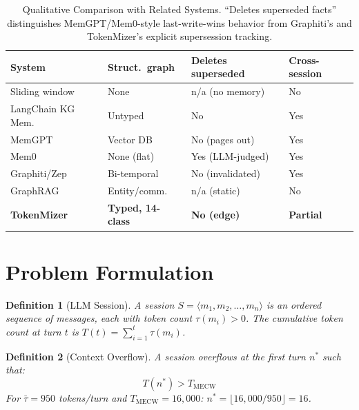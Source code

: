 \documentclass[journal]{IEEEtran}
\newtheorem{definition}{Definition}
\begin{document}
\begin{table}[t]
  \centering
  \caption{Qualitative Comparison with Related Systems.
  ``Deletes superseded facts'' distinguishes MemGPT/Mem0-style
  last-write-wins behavior from Graphiti's and TokenMizer's
  explicit supersession tracking.}
  \label{tab:related}
  \renewcommand{\arraystretch}{1.3}
  \footnotesize
  \begin{tabular}{@{}p{1.9cm}p{1.55cm}p{1.5cm}p{1.15cm}@{}}
    \toprule
    \textbf{System} & \textbf{Struct.\ graph} &
    \textbf{Deletes superseded} &
    \textbf{Cross-session} \\
    \midrule
    Sliding window      & None      & n/a (no memory) & No \\
    LangChain KG Mem.   & Untyped   & No               & Yes \\
    MemGPT~\cite{memgpt} & Vector DB & No (pages out)   & Yes \\
    Mem0~\cite{mem0}     & None (flat) & Yes (LLM-judged) & Yes \\
    Graphiti/Zep~\cite{zep} & Bi-temporal & No (invalidated) & Yes \\
    GraphRAG~\cite{graphrag} & Entity/comm. & n/a (static) & No \\
    \rowcolor{rowours}
    \textbf{TokenMizer}
      & \textbf{Typed, 14-class} & \textbf{No (edge)}
      & \textbf{Partial} \\
    \bottomrule
  \end{tabular}
\end{table}

\section{Problem Formulation}
\label{sec:problem}

\begin{definition}[LLM Session]
A session $S = \langle m_1, m_2, \ldots, m_n \rangle$ is an
ordered sequence of messages, each with token count
$\tau(m_i) > 0$. The cumulative token count at turn $t$ is
$T(t) = \sum_{i=1}^{t} \tau(m_i)$.
\end{definition}

\begin{definition}[Context Overflow]
A session overflows at the first turn $n^*$ such that:
\begin{equation}
  T(n^*) > T_{\mathrm{MECW}}
  \label{eq:overflow}
\end{equation}
For $\bar{\tau} = 950$ tokens/turn and
$T_{\mathrm{MECW}} = 16{,}000$:
$n^* = \lfloor 16{,}000 / 950 \rfloor = 16$.
\end{definition}
\end{document}
